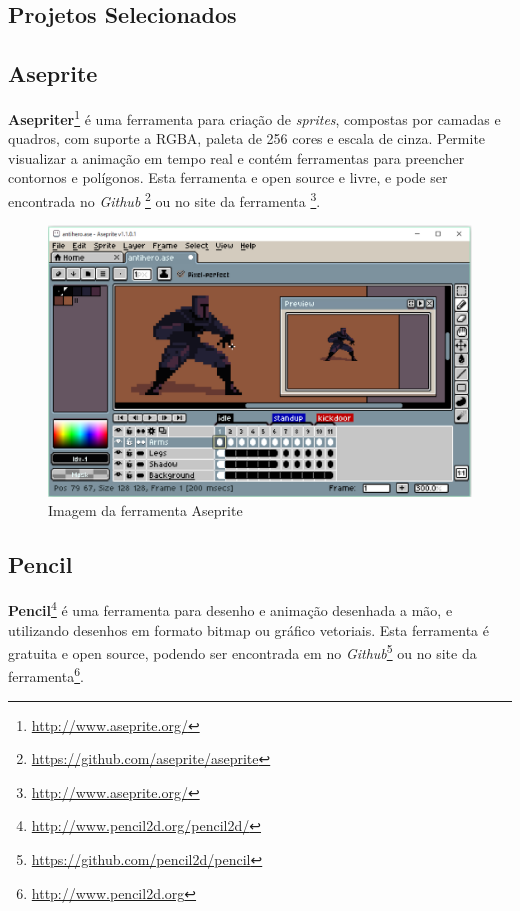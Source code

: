 \begin{apendicesenv}

\partapendices

\chapter{Projetos Selecionados}
\label{projetos_apendice}

\section{Aseprite}
    
	\textbf{Asepriter}\footnote{\url{http://www.aseprite.org/}} é uma
 ferramenta para criação de \textit{sprites}, compostas por camadas e
 quadros, com suporte a RGBA, paleta de 256 cores e escala de cinza.
 Permite visualizar a animação em tempo real e contém ferramentas para preencher contornos
 e polígonos. Esta ferramenta e open source e livre, e pode ser encontrada no \textit{Github}
 \footnote{\url{https://github.com/aseprite/aseprite}} ou no site da ferramenta
 \footnote{\url{http://www.aseprite.org/}}.

    \begin{figure}[h]
        \centering
            \includegraphics[scale=0.3]{figuras/aseprite.eps}
        \caption{Imagem da ferramenta Aseprite}
        \label{ferramenta_aseprite}
    \end{figure}

\section{Pencil}
	
    \textbf{Pencil}\footnote{\url{http://www.pencil2d.org/pencil2d/}} é uma ferramenta para
 desenho e animação desenhada a mão, e utilizando desenhos em formato bitmap ou gráfico vetoriais. 
Esta ferramenta é gratuita  e open source, podendo ser encontrada em no
 \textit{Github}\footnote{\url{https://github.com/pencil2d/pencil}} ou no site da
 ferramenta\footnote{\url{http://www.pencil2d.org}}.


\end{apendicesenv}
